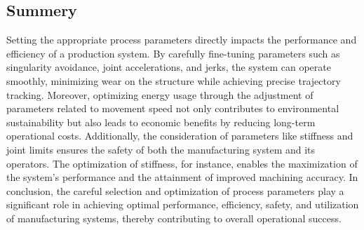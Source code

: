 \subsection{Summery}
Setting the appropriate process parameters directly impacts the performance and efficiency of a production system. By carefully fine-tuning parameters such as singularity avoidance, joint accelerations, and jerks, the system can operate smoothly, minimizing wear on the structure while achieving precise trajectory tracking. Moreover, optimizing energy usage through the adjustment of parameters related to movement speed not only contributes to environmental sustainability but also leads to economic benefits by reducing long-term operational costs. Additionally, the consideration of parameters like stiffness and joint limits ensures the safety of both the manufacturing system and its operators. The optimization of stiffness, for instance, enables the maximization of the system's performance and the attainment of improved machining accuracy. In conclusion, the careful selection and optimization of process parameters play a significant role in achieving optimal performance, efficiency, safety, and utilization of manufacturing systems, thereby contributing to overall operational success.